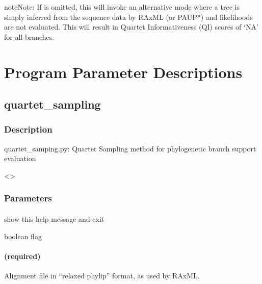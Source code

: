 \documentclass[letterpaper,12pt,english]{sphinxmanual}
\begin{document}
\begin{sphinxadmonition}{note}{Note:}
If  is omitted, this will invoke an alternative mode where a tree is simply inferred from the sequence data by RAxML (or PAUP*) and likelihoods are not evaluated.  This will result in Quartet Informativeness (QI) scores of ‘NA’ for all branches.
\end{sphinxadmonition}


\chapter{Program Parameter Descriptions}
\label{\detokenize{prog_desc:program-parameter-descriptions}}\label{\detokenize{prog_desc::doc}}

\section{quartet\_sampling}
\label{\detokenize{prog_desc:quartet-sampling}}

\subsection{Description}
\label{\detokenize{prog_desc:description}}
quartet\_samping.py: Quartet Sampling method for
phylogenetic branch support evaluation

\textless{}\textgreater{}


\subsection{Parameters}
\label{\detokenize{prog_desc:parameters}}

\subsubsection{}
\label{\detokenize{prog_desc:h-help}}
 show this help message and exit

 boolean flag


\subsubsection{ (required)}
\label{\detokenize{prog_desc:align-alignment-required}}
 Alignment file in “relaxed phylip” format, as used by RAxML.
\end{document}
